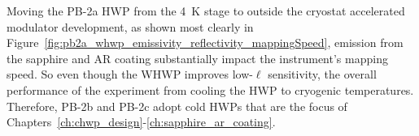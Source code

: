 Moving the PB-2a HWP from the 4~K stage to outside the cryostat accelerated modulator development, as shown most clearly in Figure~\ref{fig:pb2a_whwp_emissivity_reflectivity_mappingSpeed}, emission from the sapphire and AR coating substantially impact the instrument's mapping speed. So even though the WHWP improves low-$\ell$ sensitivity, the overall performance of the experiment from cooling the HWP to cryogenic temperatures. Therefore, PB-2b and PB-2c adopt cold HWPs that are the focus of Chapters~\ref{ch:chwp_design}-\ref{ch:sapphire_ar_coating}.